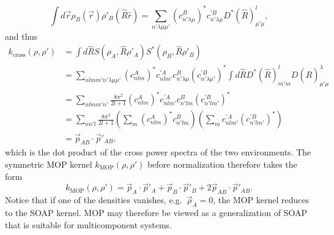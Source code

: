 \documentclass[%
preprint,
amsmath,amssymb,
aps,
]{revtex4-1}
\begin{document}
\begin{equation}
\int d\vec{r} \rho_B(\vec{r}) \rho'_B(\hat{R}\hat{r}) = \sum_{n' \lambda \mu \mu'} (c_{n' \lambda \mu}^B)^* c_{n' \lambda \mu}^{'B} D^* (\hat{R})^l_{\mu' \mu},
\end{equation}
and thus
\begin{equation}
    \begin{split}
k_{\text{cross}}(\rho, \rho') &= \int d\hat{R} S(\rho_A, \hat{R} \rho'_A) S^*(\rho_B, \hat{R}\rho'_B) \\
&= \sum_{n l m m' n' \lambda \mu \mu'} (c_{n l m}^A)^* c_{n l m'}^{'A} c_{n' \lambda \mu}^B (c_{n' \lambda \mu'}^{'B})^* \int d\hat{R} D^*(\hat{R})_{m' m}^l D(\hat{R})_{\mu' \mu}^\lambda \\
&= \sum_{n l m m' n'} \frac{8\pi^2}{2l + 1} (c_{n l m}^A)^* c_{n l m'}^{'A} c_{n' l m}^B (c_{n' l m'}^{'B})^* \\
&= \sum_{n n' l} \frac{8\pi^2}{2l+1} \left( \sum_{m} (c_{n l m}^A)^* c_{n' l m}^B \right) \left( \sum_{m} c_{n l m'}^{'A} (c_{n' l m'}^{'B})^* \right) \\
&= \vec{p}_{AB} \cdot \vec{p}'_{AB},
    \end{split}
\end{equation}
which is the dot product of the cross power spectra of the two environments. The symmetric MOP kernel $k_{\text{MOP}}(\rho, \rho')$ before normalization therefore takes the form
\begin{equation}
k_{\text{MOP}}(\rho, \rho') = \vec{p}_A \cdot \vec{p}'_A + \vec{p}_B \cdot \vec{p}'_B + 2 \vec{p}_{AB} \cdot \vec{p}'_{AB}.
\end{equation}
Notice that if one of the densities vanishes, e.g.\ $\vec{\rho}_A = 0$, the MOP kernel reduces to the SOAP kernel. MOP may therefore be viewed as a generalization of SOAP that is suitable for multicomponent systems.


\end{document}
